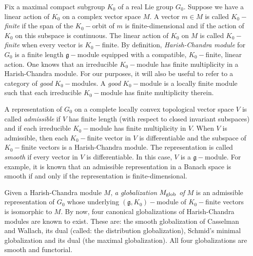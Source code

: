 Fix a maximal compact subgroup $K_{0}$ of a real Lie group $G_{0}$. Suppose we have
a linear action of $K_{0}$ on a complex vector space $M$. A vector $m\in M$
is called $K_{0}-$\emph{finite} if the span of the $K_{0}-$orbit of $m$ is
finite-dimensional and if the action of $K_{0}$ on this subspace is
continuous. The linear action of $K_{0}$ on $M$ is called $K_{0}-$\emph{%
finite} when every vector is $K_{0}-$finite. By definition, \emph{Harish-Chandra module} for $G_{0}$ is a finite length $\mathfrak{g}-$module equipped with a compatible, $K_{0}-$finite, linear action. One knows that
an irreducible $K_{0}-$module has finite multiplicity in a Harish-Chandra
module. For our purposes, it will also be useful to refer to a category of
\emph{good }$K_{0}-$modules. A \emph{good }$K_{0}-$module is a
locally finite module such that each irreducible $K_{0}-$module has finite
multiplicity therein.

 A representation of $G_{0}$ on a complete locally convex
topological vector space $V$ is called \emph{admissible} if $V$ has finite
length (with respect to closed invariant subspaces) and if each irreducible $%
K_{0}-$module has finite multiplicity in $V$. When $V$ is admissible, then
each $K_{0}-$finite vector in $V$ is differentiable and the subspace of $%
K_{0}-$finite vectors is a Harish-Chandra module. The representation is
called \emph{smooth} if every vector in $V$ is differentiable. In this case,
$V$ is a $\mathfrak{g}-$module. For example, it is known that an admissible
representation in a Banach space is smooth if and only if the representation
is finite-dimensional.

Given a Harish-Chandra module $M$, \emph{a globalization} $M_{%
\text{glob}}$ \emph{of }$M$ is an admissible representation of $G_{0}$ whose
underlying $(\mathfrak{g},K_{0})-$module of $K_{0}-$finite vectors is
isomorphic to $M$. By now, four canonical globalizations of Harish-Chandra
modules are known to exist. These are: the smooth globalization of Casselman
and Wallach, its dual (called: the distribution globalization),
Schmid's minimal globalization and its dual (the maximal
globalization). All four globalizations are smooth and functorial.


